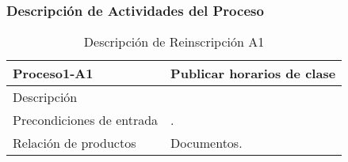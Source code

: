 \newpage
\subsubsection{Descripción de Actividades del Proceso}		%



\begin{table}[H]
\centering
	\begin{tabular}{p{5cm} p{11cm}}
		\hline
			\textbf{Proceso1-A1} & \textbf{Publicar horarios de clase}\\
		\hline\hline
			Descripción & \\
		\hline
			Precondiciones de entrada &.\\					
		\hline
			Relación de productos & Documentos.\\
		\hline
	\end{tabular}
\caption{Descripción de Reinscripción A1}
\end{table}





